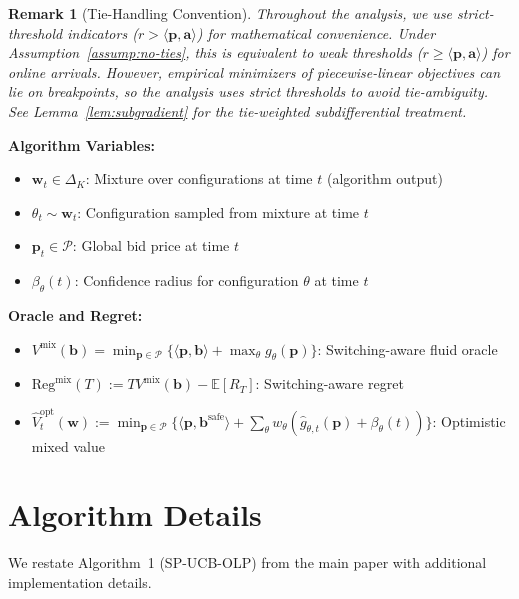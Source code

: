 \documentclass[11pt]{article}
\newtheorem{remark}{Remark}
\newcommand{\bb}{\mathbf{b}}
\newcommand{\bbS}{\mathbf{b}^{\mathrm{safe}}}
\newcommand{\ba}{\mathbf{a}}
\newcommand{\bp}{\mathbf{p}}
\newcommand{\bw}{\mathbf{w}}
\newcommand{\E}{\mathbb{E}}
\newcommand{\cP}{\mathcal{P}}
\begin{document}
\begin{remark}[Tie-Handling Convention]
\label{rem:tie-convention}
Throughout the analysis, we use strict-threshold indicators ($r > \langle \bp, \ba \rangle$) for mathematical convenience. Under Assumption~\ref{assump:no-ties}, this is equivalent to weak thresholds ($r \ge \langle \bp, \ba \rangle$) for online arrivals. However, empirical minimizers of piecewise-linear objectives can lie on breakpoints, so the analysis uses strict thresholds to avoid tie-ambiguity. See Lemma~\ref{lem:subgradient} for the tie-weighted subdifferential treatment.
\end{remark}

\textbf{Algorithm Variables:}
\begin{itemize}
    \item $\bw_t \in \Delta_K$: Mixture over configurations at time $t$ (algorithm output)
    \item $\theta_t \sim \bw_t$: Configuration sampled from mixture at time $t$
    \item $\bp_t \in \cP$: Global bid price at time $t$
    \item $\beta_\theta(t)$: Confidence radius for configuration $\theta$ at time $t$
\end{itemize}

\textbf{Oracle and Regret:}
\begin{itemize}
    \item $V^{\mathrm{mix}}(\bb) = \min_{\bp \in \cP} \{\langle \bp, \bb \rangle + \max_\theta g_\theta(\bp)\}$: Switching-aware fluid oracle
    \item $\mathrm{Reg}^{\mathrm{mix}}(T) := T V^{\mathrm{mix}}(\bb) - \E[R_T]$: Switching-aware regret
    \item $\widehat{V}_t^{\mathrm{opt}}(\bw) := \min_{\bp \in \cP}\{\langle \bp, \bbS\rangle + \sum_\theta w_\theta (\widehat{g}_{\theta,t}(\bp) + \beta_\theta(t))\}$: Optimistic mixed value
\end{itemize}

\section{Algorithm Details}
\label{app:algorithm}

We restate Algorithm~1 (SP-UCB-OLP) from the main paper with additional implementation details.
\end{document}
